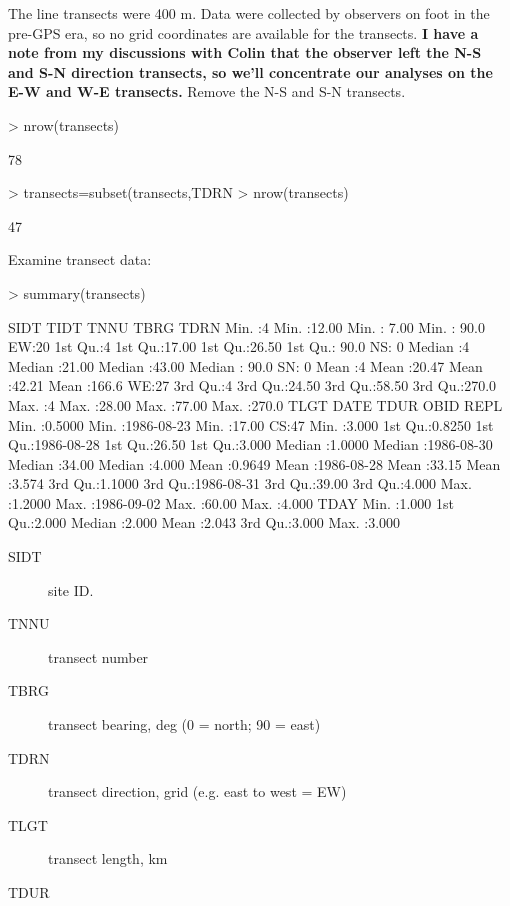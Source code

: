 \documentclass{article}
\begin{document}
The line transects were 400 m. Data were collected by observers on foot in the pre-GPS era, so no grid coordinates are available for the transects.  \textbf{I have a note from my discussions with Colin that the observer left the N-S and S-N direction transects, so we'll concentrate our analyses on the E-W and W-E transects.}  Remove the N-S and S-N transects.
\begin{Schunk}
\begin{Sinput}
> nrow(transects)
\end{Sinput}
\begin{Soutput}
[1] 78
\end{Soutput}
\begin{Sinput}
> transects=subset(transects,TDRN %
> nrow(transects)
\end{Sinput}
\begin{Soutput}
[1] 47
\end{Soutput}
\end{Schunk}
Examine transect data:
\begin{Schunk}
\begin{Sinput}
> summary(transects)
\end{Sinput}
\begin{Soutput}
      SIDT        TIDT            TNNU            TBRG       TDRN   
 Min.   :4   Min.   :12.00   Min.   : 7.00   Min.   : 90.0   EW:20  
 1st Qu.:4   1st Qu.:17.00   1st Qu.:26.50   1st Qu.: 90.0   NS: 0  
 Median :4   Median :21.00   Median :43.00   Median : 90.0   SN: 0  
 Mean   :4   Mean   :20.47   Mean   :42.21   Mean   :166.6   WE:27  
 3rd Qu.:4   3rd Qu.:24.50   3rd Qu.:58.50   3rd Qu.:270.0          
 Max.   :4   Max.   :28.00   Max.   :77.00   Max.   :270.0          
      TLGT             DATE                 TDUR       OBID         REPL      
 Min.   :0.5000   Min.   :1986-08-23   Min.   :17.00   CS:47   Min.   :3.000  
 1st Qu.:0.8250   1st Qu.:1986-08-28   1st Qu.:26.50           1st Qu.:3.000  
 Median :1.0000   Median :1986-08-30   Median :34.00           Median :4.000  
 Mean   :0.9649   Mean   :1986-08-28   Mean   :33.15           Mean   :3.574  
 3rd Qu.:1.1000   3rd Qu.:1986-08-31   3rd Qu.:39.00           3rd Qu.:4.000  
 Max.   :1.2000   Max.   :1986-09-02   Max.   :60.00           Max.   :4.000  
      TDAY      
 Min.   :1.000  
 1st Qu.:2.000  
 Median :2.000  
 Mean   :2.043  
 3rd Qu.:3.000  
 Max.   :3.000  
\end{Soutput}
\end{Schunk}
\begin{description}
  \item[SIDT] site ID.
  \item[TNNU] transect number
  \item[TBRG] transect bearing, deg (0 = north; 90 = east)
  \item[TDRN] transect direction, grid (e.g. east to west = EW)
  \item[TLGT] transect length, km
  \item[TDUR]  
\end{description}
\end{document}
